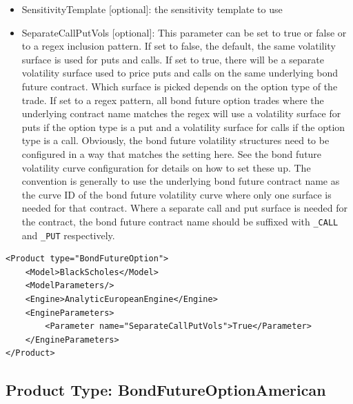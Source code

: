 \begin{itemize}
\item SensitivityTemplate [optional]: the sensitivity template to use
\item SeparateCallPutVols [optional]: This parameter can be set to true or false or to a regex inclusion pattern.
  If set to false, the default, the same volatility surface is used for puts and calls.
  If set to true, there will be a separate volatility surface used to price puts and calls on the same underlying 
  bond future contract. Which surface is picked depends on the option type of the trade.
  If set to a regex pattern, all bond future option trades where the underlying contract name matches the regex 
  will use a volatility surface for puts if the option type is a put and a volatility surface for calls if the 
  option type is a call.
  Obviously, the bond future volatility structures need to be configured in a way that matches the setting here.
  See the bond future volatility curve configuration for details on how to set these up. The convention is 
  generally to use the underlying bond future contract name as the curve ID of the bond future volatility 
  curve where only one surface is needed for that contract.
  Where a separate call and put surface is needed for the contract, the bond future contract name should be 
  suffixed with \lstinline!_CALL! and \lstinline!_PUT! respectively.
\end{itemize}

\begin{longlisting}
\begin{verbatim}
<Product type="BondFutureOption">
    <Model>BlackScholes</Model>
    <ModelParameters/>
    <Engine>AnalyticEuropeanEngine</Engine>
    <EngineParameters>
        <Parameter name="SeparateCallPutVols">True</Parameter>
    </EngineParameters>
</Product>
\end{verbatim}
\caption{Configuration for Product BondFutureOption, Model BlackScholes, Engine AnalyticEuropeanEngine}
\label{lst:peconfig_BondFutureOption_BlackScholes_AnalyticEuropeanEngine}
\end{longlisting}

\subsection{Product Type: BondFutureOptionAmerican}

